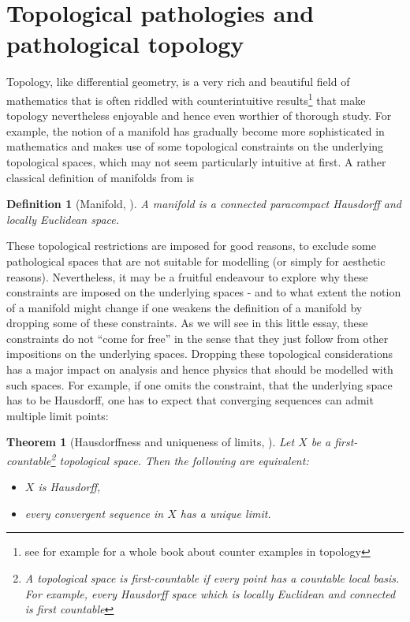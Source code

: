 \documentclass[a4paper, 12pt]{article}
\newtheorem{definition}{Definition}
\newtheorem{theorem}{Theorem}
\theoremstyle{iremark}
\begin{document}
\section{Topological pathologies and pathological topology}
Topology, like differential geometry, is a very rich and beautiful field of mathematics that is often riddled with 
counterintuitive results\footnote{see for example \cite{counter} for a whole book about counter examples in topology} 
that make topology nevertheless enjoyable and hence even worthier of thorough study. For example, the notion of a manifold 
has gradually become more sophisticated in mathematics and makes use of some topological constraints on the underlying 
topological spaces, which may not seem particularly intuitive at first.
A rather classical definition of manifolds from \cite{jost} is
\begin{definition}[Manifold, \cite{jost}]
    A manifold is a connected paracompact Hausdorff and locally Euclidean space.
\end{definition}
These topological restrictions are imposed for good reasons, to exclude some pathological spaces that are not suitable for 
modelling (or simply for aesthetic reasons). Nevertheless, it may be a fruitful endeavour to explore why these constraints 
are imposed on the underlying spaces - and to what extent the notion of a manifold might change if one weakens the definition 
of a manifold by dropping some of these constraints. As we will see in this little essay, these constraints do 
not ``come for free'' in the sense that they just follow from other impositions on the underlying spaces. Dropping these 
topological considerations has a major impact on analysis and hence physics that should be modelled with such spaces. 
For example, if one omits the constraint, that the underlying space has to be Hausdorff, one has to expect that converging 
sequences can admit multiple limit points:\newpage
\begin{theorem}[Hausdorffness and uniqueness of limits, \cite{wiki}]
    Let $X$ be a first-countable\footnote{A topological space is first-countable if every point has a countable local basis. 
    For example, every Hausdorff space which is locally Euclidean and connected is first countable} topological space. 
    Then the following are equivalent:
    \begin{itemize}
        \item $X$ is Hausdorff,
        \item every convergent sequence in $X$ has a unique limit.
    \end{itemize}
\end{theorem}
\end{document}
